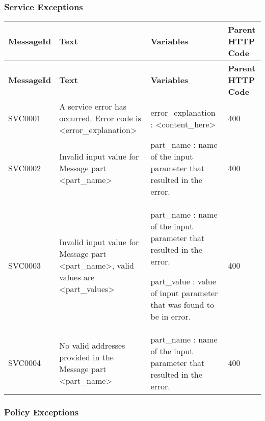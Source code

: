 
\subsubsection{Service Exceptions}

\begin{comment}
List the service exceptions generated by the operation (indicate any
variation that exists across different versions):
\end{comment}


\begin{longtable}{|>{\raggedright}p{}|>{\raggedright}p{}|>{\raggedright}p{}|>{\raggedright}p{}|}
\hline
\hline 
\textbf{\footnotesize{MessageId}} & \textbf{\footnotesize{Text}} & \textbf{\footnotesize{Variables}} & \textbf{\footnotesize{Parent HTTP Code}}\tabularnewline
\hline 
\hline
\endfirsthead
\hline
\hline 
\textbf{\footnotesize{MessageId}} & \textbf{\footnotesize{Text}} & \textbf{\footnotesize{Variables}} & \textbf{\footnotesize{Parent HTTP Code}}\tabularnewline
\hline 
\hline
\endhead
\hline 
{\footnotesize{SVC0001}} & {\footnotesize{A service error has occurred. Error code is <error\_explanation>}} & {\footnotesize{error\_explanation : <content\_here>}} & {\footnotesize{400}}\tabularnewline
\hline 
{\footnotesize{SVC0002}} & {\footnotesize{Invalid input value for Message part <part\_name>}} & {\footnotesize{part\_name : name of the input parameter that resulted
in the error.}} & {\footnotesize{400}}\tabularnewline
\hline 
{\footnotesize{SVC0003}} & {\footnotesize{Invalid input value for Message part <part\_name>,
valid values are <part\_values>}} & {\footnotesize{part\_name : name of the input parameter that resulted
in the error.}}{\footnotesize \par}

{\footnotesize{part\_value : value of input parameter that was found
to be in error.}} & {\footnotesize{400}}\tabularnewline
\hline 
{\footnotesize{SVC0004}} & {\footnotesize{No valid addresses provided in the Message part <part\_name>}} & {\footnotesize{part\_name : name of the input parameter that resulted
in the error.}} & {\footnotesize{400}}\tabularnewline
\hline 
\end{longtable}


\subsubsection{Policy Exceptions}

\begin{comment}
List the policy exceptions generated by the operation (indicate any
variation that exists across different versions):
\end{comment}


